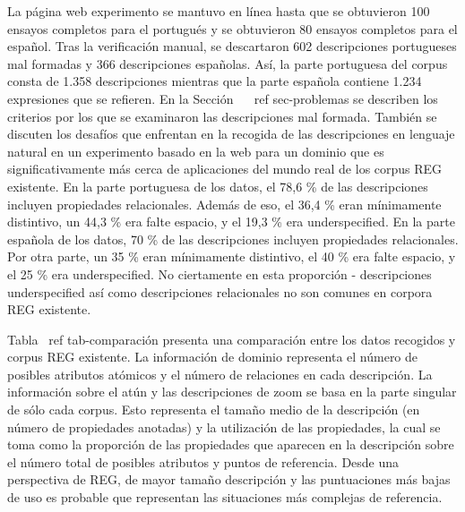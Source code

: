
La p\'agina web experimento se mantuvo en l\'{i}nea hasta que se obtuvieron 100 ensayos completos para el portugu\'es y se obtuvieron 80 ensayos completos para el espa\~nol. Tras la verificaci\'on manual, se descartaron 602 descripciones portugueses mal formadas y 366 descripciones espa\~nolas. As\'{i}, la parte portuguesa del corpus consta de 1.358 descripciones mientras que la parte espa\~nola contiene 1.234 expresiones que se refieren. En la Secci\'on ~ \ ref {sec-problemas} se describen los criterios por los que se examinaron las descripciones mal formada. Tambi\'en se discuten los desaf\'{i}os que enfrentan en la recogida de las descripciones en lenguaje natural en un experimento basado en la web para un dominio que es significativamente m\'as cerca de aplicaciones del mundo real de los corpus REG existente.
En la parte portuguesa de los datos, el 78,6 \% de las descripciones incluyen propiedades relacionales. Adem\'as de eso, el 36,4 \% eran m\'{i}nimamente distintivo, un 44,3 \% era falte espacio, y el 19,3 \% era underspecified. En la parte espa\~nola de los datos, 70 \% de las descripciones incluyen propiedades relacionales. Por otra parte, un 35 \% eran m\'{i}nimamente distintivo, el 40 \% era falte espacio, y el 25 \% era underspecified. No ciertamente en esta proporci\'on - descripciones underspecified as\'{i} como descripciones relacionales no son comunes en corpora REG existente.

Tabla \ ref {tab-comparaci\'on} presenta una comparaci\'on entre los datos recogidos y corpus REG existente. La informaci\'on de dominio representa el n\'umero de posibles atributos at\'omicos y el n\'umero de relaciones en cada descripci\'on. La informaci\'on sobre el at\'un y las descripciones de zoom se basa en la parte singular de s\'olo cada corpus. Esto representa el tama\~no medio de la descripci\'on (en n\'umero de propiedades anotadas) y la utilizaci\'on de las propiedades, la cual se toma como la proporci\'on de las propiedades que aparecen en la descripci\'on sobre el n\'umero total de posibles atributos y puntos de referencia. Desde una perspectiva de REG, de mayor tama\~no descripci\'on y las puntuaciones m\'as bajas de uso es probable que representan las situaciones m\'as complejas de referencia.


